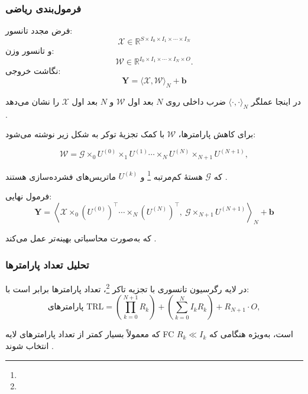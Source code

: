 \subsubsection*{فرمول‌بندی ریاضی}

فرض مجدد تانسور:
\[
\mathcal{X} \in \mathbb{R}^{S \times I_0 \times I_1 \times \cdots \times I_N}
\]
و تانسور وزن:
\[
\mathcal{W} \in \mathbb{R}^{I_0 \times I_1 \times \cdots \times I_N \times O}.
\]
نگاشت خروجی:
\begin{equation}
	\mathbf{Y} = \langle \mathcal{X}, \mathcal{W} \rangle_N + \mathbf{b}
\end{equation}

در اینجا عملگر \(\langle \cdot,\cdot \rangle_N\) ضرب داخلی روی \(N\) بعد اول \(\mathcal{W}\) و \(N\) بعد اول \(\mathcal{X}\) را نشان می‌دهد \cite{kossaifi2020tensorregression}.

برای کاهش پارامترها، \(\mathcal{W}\)‌ با کمک تجزیۀ توکر به شکل زیر نوشته می‌شود:

\begin{equation}
	\mathcal{W} = \mathcal{G} \times_0 U^{(0)} \times_1 U^{(1)} \cdots \times_N U^{(N)} \times_{N+1} U^{(N+1)},
\end{equation}


که \(\mathcal{G}\) هستهٔ کم‌مرتبه \footnote{} و \(U^{(k)}\) ماتریس‌های فشرده‌سازی هستند \cite{kossaifi2020tensorregression}.

فرمول نهایی:
\begin{equation}
	\mathbf{Y} = \left\langle 
	\mathcal{X} \times_0 (U^{(0)})^\top \cdots \times_N (U^{(N)})^\top,\ 
	\mathcal{G} \times_{N+1} U^{(N+1)} 
	\right\rangle_N + \mathbf{b}
\end{equation}

که به‌صورت محاسباتی بهینه‌تر عمل می‌کند \cite{kossaifi2020tensorregression}.

\subsubsection*{تحلیل تعداد پارامترها}

در لایه رگرسیون تانسوری با تجزیه تاکر \footnote{}، تعداد پارامترها برابر است با:
\begin{equation}
	\text{پارامترهای TRL} = \left(\prod_{k=0}^{N+1} R_k\right) 
	+ \left(\sum_{k=0}^{N} I_k R_k\right) 
	+ R_{N+1} \cdot O,
\end{equation}

که معمولاً بسیار کمتر از تعداد پارامترهای لایه FC است، به‌ویژه هنگامی که \(R_k \ll I_k\) انتخاب شوند \cite{kossaifi2020tensorregression}.


